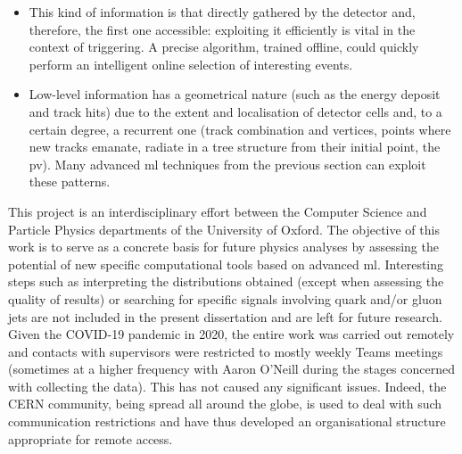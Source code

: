 \begin{itemize}
\item This kind of information is that directly gathered by the detector and, therefore, the first one accessible: exploiting it efficiently is vital in the context of triggering. A precise algorithm, trained offline, could quickly perform an intelligent online selection of interesting events. 
\item Low-level information has a geometrical nature (such as the energy deposit and track hits) due to the extent and localisation of detector cells and, to a certain degree, a recurrent one (track combination and vertices, points where new tracks emanate, radiate in a tree structure from their initial point, the \gls{pv}). Many advanced \gls{ml} techniques from the previous section can exploit these patterns. 
\end{itemize}

This project is an interdisciplinary effort between the Computer Science and Particle Physics departments of the University of Oxford. The objective of this work is to serve as a concrete basis for future physics analyses by assessing the potential of new specific computational tools based on advanced \gls{ml}. Interesting steps such as interpreting the distributions obtained (except when assessing the quality of results) or searching for specific signals involving quark and/or gluon jets are not included in the present dissertation and are left for future research. Given the COVID-19 pandemic in 2020, the entire work was carried out remotely and contacts with supervisors were restricted to mostly weekly Teams meetings (sometimes at a higher frequency with Aaron O'Neill during the stages concerned with collecting the data). This has not caused any significant issues. Indeed, the CERN community, being spread all around the globe, is used to deal with such communication restrictions and have thus developed an organisational structure appropriate for remote access.

\vspace{3.5cm}


